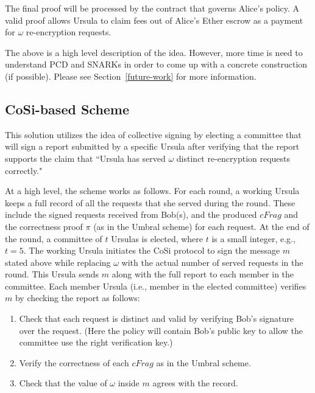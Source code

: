 The final proof will be processed by the contract that governs Alice's policy. A valid proof 
allows Ursula to claim fees out of Alice's Ether escrow as a payment for $\omega$ re-encryption  
requests. 


The above is a high level description of the idea. However, more time is need to 
understand PCD and SNARKs in order to come up with a concrete construction 
(if possible). Please see Section~\ref{future-work} for more information.


\subsection{CoSi-based Scheme}
This solution utilizes the idea of collective signing by electing a committee 
that will sign a report submitted by a specific Ursula after verifying that 
the report supports the claim that ``Ursula has served $\omega$ distinct 
re-encryption requests correctly." 


At a high level, the scheme works as follows. For each round, a working Ursula keeps 
a full record of all the requests that she served during the round. These 
include the signed requests received from Bob(s), and the produced $cFrag$ 
and the correctness proof $\pi$ (as in the Umbral scheme) for 
each request. At the end of the round, a committee of $t$ Ursulas is 
elected, where $t$ is a small integer, e.g., $t = 5$. The working Ursula 
initiates the CoSi protocol to sign the message $m$ stated above while 
replacing $\omega$ with the actual number of served 
requests in the round. This Ursula sends $m$ along with the full report to 
each member in the committee. Each member Ursula (i.e., member in the 
elected committee) verifies $m$ by checking the report as follows:
\begin{enumerate}
\setlength{\itemsep}{0pt}
\item Check that each request is distinct and valid by verifying Bob's 
signature over the request. (Here the policy will contain Bob's public 
key to allow the committee use the right verification key.)

\item Verify the correctness of each $cFrag$ as in the Umbral 
scheme.

\item Check that the value of $\omega$ inside $m$ agrees with the 
record.
\end{enumerate}


